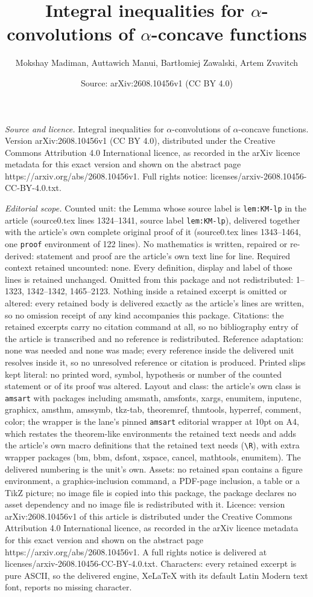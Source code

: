 \documentclass[10pt,a4paper]{amsart}
\title[Integral inequalities for $\alpha$-convolutions of $\alpha$-]{Integral inequalities for $\alpha$-convolutions of $\alpha$-concave functions}
\author{Mokshay Madiman, Auttawich Manui, Bart\l{}omiej Zawalski, Artem Zvavitch}
\date{Source: arXiv:2608.10456v1 (CC BY 4.0)}
\begin{document}
\maketitle

\noindent\emph{Source and licence.} Integral inequalities for $\alpha$-convolutions of $\alpha$-concave functions. Version arXiv:2608.10456v1 (CC BY 4.0), distributed under the Creative Commons Attribution 4.0 International licence, as recorded in the arXiv licence metadata for this exact version and shown on the abstract page https://arxiv.org/abs/2608.10456v1. Full rights notice: licenses/arxiv-2608.10456-CC-BY-4.0.txt.\par\smallskip

\noindent\textit{Editorial scope.} Counted unit: the Lemma whose source label is \texttt{lem:KM-lp} in the article (source0.tex lines 1324--1341, source label \texttt{lem:KM-lp}), delivered together with the article's own complete original proof of it (source0.tex lines 1343--1464, one \texttt{proof} environment of 122 lines). No mathematics is written, repaired or re-derived: statement and proof are the article's own text line for line. Required context retained uncounted: none. Every definition, display and label of those lines is retained unchanged. Omitted from this package and not redistributed: 1--1323, 1342--1342, 1465--2123. Nothing inside a retained excerpt is omitted or altered: every retained body is delivered exactly as the article's lines are written, so no omission receipt of any kind accompanies this package. Citations: the retained excerpts carry no citation command at all, so no bibliography entry of the article is transcribed and no reference is redistributed. Reference adaptation: none was needed and none was made; every reference inside the delivered unit resolves inside it, so no unresolved reference or citation is produced. Printed slips kept literal: no printed word, symbol, hypothesis or number of the counted statement or of its proof was altered. Layout and class: the article's own class is \texttt{amsart} with packages including amsmath, amsfonts, xargs, enumitem, inputenc, graphicx, amsthm, amssymb, tkz-tab, theoremref, thmtools, hyperref, comment, color; the wrapper is the lane's pinned \texttt{amsart} editorial wrapper at 10pt on A4, which restates the theorem-like environments the retained text needs and adds the article's own macro definitions that the retained text needs (\texttt{\textbackslash R}), with extra wrapper packages (bm, bbm, dsfont, xspace, cancel, mathtools, enumitem). The delivered numbering is the unit's own. Assets: no retained span contains a figure environment, a graphics-inclusion command, a PDF-page inclusion, a table or a TikZ picture; no image file is copied into this package, the package declares no asset dependency and no image file is redistributed with it. Licence: version arXiv:2608.10456v1 of this article is distributed under the Creative Commons Attribution 4.0 International licence, as recorded in the arXiv licence metadata for this exact version and shown on the abstract page https://arxiv.org/abs/2608.10456v1. A full rights notice is delivered at licenses/arxiv-2608.10456-CC-BY-4.0.txt. Characters: every retained excerpt is pure ASCII, so the delivered engine, XeLaTeX with its default Latin Modern text font, reports no missing character.
\end{document}
